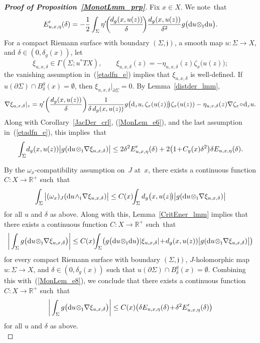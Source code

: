 \documentclass[11pt]{article}
\numberwithin{equation}{section}
\theoremstyle{definition}
\def\BE#1{\begin{equation}\label{#1}}
\def\EE{\end{equation}}
\def\eref#1{(\ref{#1})}
\def\lra{\longrightarrow}
\def\fj{\mathfrak j}
\def\R{\mathbb R}
\def\de{\delta}
\def\na{\nabla}
\def\om{\omega}
\def\ze{\zeta}
\def\Ga{\Gamma}
\def\Si{\Sigma}
\def\eset{\emptyset}
\def\prt{\partial}
\def\w{\wedge}
\def\nd{\textnormal{d}}
\begin{document}
\begin{proof}[{\bf\emph{Proof of Proposition~\ref{MonotLmm_prp}}}]
\noindent
Fix $x\!\in\!X$. We note~that
\BE{MonLem_e6}
E_{u,x,\eta}'(\de)=-\frac12\int_{\Si}\eta'\!\bigg(\!\frac{d_g(x,u(z))}{\de}\!\bigg)
\frac{d_g(x,u(z))}{\de^2}
g\big(\nd u\!\otimes_{\fj}\!\nd u\big).\EE
For a compact Riemann surface with boundary $(\Si,\fj)$,
a smooth map \hbox{$u\!:\Si\!\lra\!X$}, and \hbox{$\de\!\in\!(0,\de_g(x))$}, 
let
$$\xi_{u,x,\de}\in \Ga(\Si;u^*TX), \qquad
\xi_{u,x,\de}(z)=-\eta_{u,x,\de}(z)\ze_x\big(u(z)\big);$$
the vanishing assumption in~\eref{etadfn_e} implies that $\xi_{u,x,\de}$
is well-defined.
If $u(\prt\Si)\!\cap\!B_{\de}^g(x)\!=\!\eset$, then $\xi_{u,x,\de}|_{\prt\Si}\!=\!0$.
By Lemma~\ref{distder_lmm},
\BE{MonLem_e0}\begin{split}
\na\xi_{u,x,\de}|_z
=\eta'\bigg(\frac{d_g(x,u(z))}{\de}\bigg)\frac{1}{\de\,d_g(x,u(z))}
g\big(\nd_zu,\ze_x(u(z))\!\big)\ze_x(u(z))
-\eta_{u,x,\de}(z)\na\ze_x\!\circ\!\nd_zu.
\end{split}\EE
Along with Corollary~\ref{JacDer_crl}, \eref{MonLem_e6}, 
and the last assumption in~\eref{etadfn_e}, this implies~that 
\BE{MonLem_e8}
\int_{\Si}\!d_g(x,u(z))\big|g(\nd u\!\otimes_{\fj}\!\na\xi_{u,x,\de})\big|
\le 2\de^2 E_{u,x,\eta}'(\de)+2\big(1\!+\!C_g(x)\de^2\big)\de E_{u,x,\eta}(\de).\EE

\vspace{.1in}

\noindent
By the $\om_x$-compatibility assumption on~$J$ at~$x$, there exists 
a continuous function \hbox{$C\!:X\!\lra\!\R^+$} such~that 
$$\int_{\Si}\big|(\om_x)_J(\nd u\!\w_{\fj}\!\na\xi_{u,x,\de})\big|
\le C(x)\!\!\int_{\Si}d_g\big(x,u(z)\!\big)\big|g(\nd u\!\otimes_{\fj}\!\na\xi_{u,x,\de})\big|$$
for all $u$ and $\de$ as above.
Along with this, Lemma~\ref{CritEner_lmm} implies that 
there exists a continuous function \hbox{$C\!:X\!\lra\!\R^+$} such~that 
$$\bigg|\int_{\Si}g\big(\nd u\!\otimes_{\fj}\!\na\xi_{u,x,\de}\big)\bigg|
\le C(x)\!\!\int_{\Si}\!\big(g\big(\nd u\!\otimes_{\fj}\!\nd u\big)|\xi_{u,x,\de}|
\!+\!d_g(x,u(z))\big|g(\nd u\!\otimes_{\fj}\!\na\xi_{u,x,\de})\big|\big)$$
for every compact Riemann surface with boundary $(\Si,\fj)$,
$J$-holomorphic map \hbox{$u\!:\Si\!\lra\!X$}, and $\de\!\in\!(0,\de_g(x))$ 
such that $u(\prt\Si)\!\cap\!B_{\de}^g(x)\!=\!\eset$.
Combining this with~\eref{MonLem_e8}, we conclude that 
there exists a continuous function \hbox{$C\!:X\!\lra\!\R^+$} such~that
\BE{MonLem_e0b}
\bigg|\int_{\Si}g\big(\nd u\!\otimes_{\fj}\!\na\xi_{u,x,\de}\big)\bigg|
\le C(x)\big(\de E_{u,x,\eta}(\de)\!+\!\de^2E_{u,x,\eta}'(\de)\big)\EE
for all $u$ and $\de$ as above.\\


\end{proof}
\end{document}
